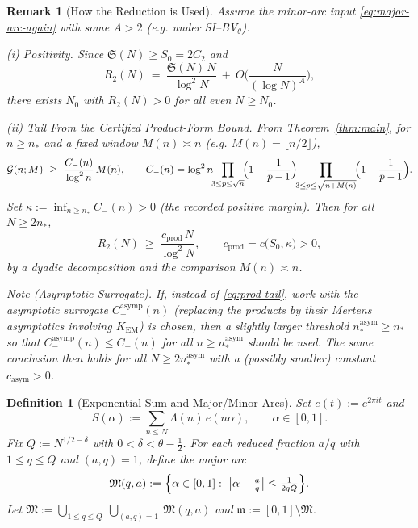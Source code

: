 \documentclass[11pt]{article}
\theoremstyle{inline}
\newtheorem*{remark}{Remark}
\theoremstyle{break}
\theoremstyle{break}
\theoremstyle{break}
\theoremstyle{break}
\theoremstyle{break}
\theoremstyle{break}
\theoremstyle{break}
\newtheorem{definition}{Definition}
\theoremstyle{inline}
\newcommand{\CminusProduct}{C_{-}}
\newcommand{\CminusAsymp}{C_{-}^{\mathrm{asymp}}}
\newcommand{\Kem}{K_{\mathrm{EM}}}              %
\newcommand{\Szero}{S_0}                        %
\newcommand{\nprodstar}{n_{\ast}}  %
\newcommand{\nasymstar}{n_{\ast}^{\mathrm{asym}}}  %
\newcommand{\kappaprod}{\kappa}    %
\begin{document}
\begin{remark}[How the Reduction is Used]
\label{rem:reduction-use}
Assume the minor-arc input \eqref{eq:major-arc-again} with some \(A>2\) (e.g. under SI--BV\(_\theta\)).

(i) \emph{Positivity.} Since \(\mathfrak S(N)\ge \Szero=2C_2\) and
\[
R_2(N)\ =\ \frac{\mathfrak S(N)\,N}{\log^2 N}\ +\ O\!\Big(\frac{N}{(\log N)^A}\Big),
\]
there exists \(N_0\) with \(R_2(N)>0\) for all even \(N\ge N_0\).

(ii) \emph{Tail From the Certified \emph{Product-Form} Bound.}
From Theorem~\ref{thm:main}, for \(n\ge \nprodstar\) and a fixed window \(M(n)\asymp n\) (e.g. \(M(n)=\lfloor n/2\rfloor\)),
\begin{equation}\label{eq:prod-tail}
\mathcal G(n;M)\ \ge\ \frac{\CminusProduct(n)}{\log^2 n}\,M(n),
\qquad
\CminusProduct(n)=\log^2 n\!\!\prod_{3\le p\le \sqrt n}\!\Bigl(1-\frac{1}{p-1}\Bigr)
\!\!\prod_{3\le p\le \sqrt{n+M(n)}}\!\Bigl(1-\frac{1}{p-1}\Bigr).
\end{equation}
Set \(\displaystyle \kappaprod:=\inf_{n\ge \nprodstar}\CminusProduct(n)>0\) (the recorded positive margin).
Then for all \(N\ge 2\nprodstar\),
\[
R_2(N)\ \ge\ \frac{c_{\mathrm{prod}}\,N}{\log^2 N},
\qquad
c_{\mathrm{prod}}=c\big(\Szero,\kappaprod\big)>0,
\]
by a dyadic decomposition and the comparison \(M(n)\asymp n\).

\smallskip
\emph{Note (Asymptotic Surrogate).}
If, instead of \eqref{eq:prod-tail}, work with the asymptotic surrogate
\(\CminusAsymp(n)\) (replacing the products by their Mertens asymptotics involving \(\Kem\)) is chosen, then a slightly larger threshold \(\nasymstar\ge \nprodstar\) so that \(\CminusAsymp(n)\le \CminusProduct(n)\) for all \(n\ge\nasymstar\) should be used. The same conclusion then holds for all \(N\ge 2\nasymstar\) with a (possibly smaller) constant \(c_{\mathrm{asym}}>0\).
\end{remark}

\begin{definition}[Exponential Sum and Major/Minor Arcs]
\label{def:S-and-arcs}
Set \(e(t):=e^{2\pi i t}\) and
\begin{equation}\label{eq:S-alpha}
S(\alpha):=\sum_{n\le N}\Lambda(n)\,e(n\alpha),\qquad \alpha\in[0,1].
\end{equation}
Fix \(Q:=N^{1/2-\delta}\) with \(0<\delta<\theta-\tfrac12\). For each reduced fraction \(a/q\) with \(1\le q\le Q\) and \((a,q)=1\), define the major arc
\[
\mathfrak M(q,a):=\Bigl\{\alpha\in[0,1]:\ \bigl|\alpha-\tfrac{a}{q}\bigr| \le \tfrac{1}{2qQ}\Bigr\}.
\]
Let \(\mathfrak M:=\bigcup_{1\le q\le Q}\ \bigcup_{(a,q)=1}\ \mathfrak M(q,a)\) and \(\mathfrak m:=[0,1]\setminus \mathfrak M\).
\end{definition}
\end{document}

